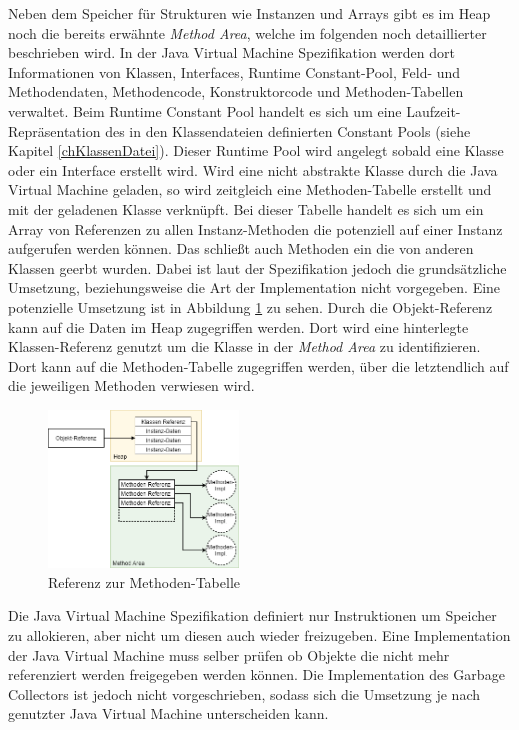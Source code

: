 \documentclass[conference]{IEEEtran}
\begin{document}
Neben dem Speicher für Strukturen wie Instanzen und Arrays gibt es im Heap noch die bereits erwähnte \textit{Method Area}, welche im folgenden noch detaillierter beschrieben wird. In der Java Virtual Machine Spezifikation werden dort Informationen von Klassen, Interfaces, Runtime Constant-Pool, Feld- und Methodendaten, Methodencode, Konstruktorcode und Methoden-Tabellen verwaltet. Beim Runtime Constant Pool handelt es sich um eine Laufzeit-Repräsentation des in den Klassendateien definierten Constant Pools (siehe Kapitel \ref{chKlassenDatei}). Dieser Runtime Pool wird angelegt sobald eine Klasse oder ein Interface erstellt wird. Wird eine nicht abstrakte Klasse durch die Java Virtual Machine geladen, so wird zeitgleich eine Methoden-Tabelle erstellt und mit der geladenen Klasse verknüpft. Bei dieser Tabelle handelt es sich um ein Array von Referenzen zu allen Instanz-Methoden die potenziell auf einer Instanz aufgerufen werden können. Das schließt auch Methoden ein die von anderen Klassen geerbt wurden. Dabei ist laut der Spezifikation jedoch die grundsätzliche Umsetzung, beziehungsweise die Art der Implementation nicht vorgegeben. Eine potenzielle Umsetzung ist in Abbildung \ref{fig:linkZurMethodenTabelle} zu sehen. Durch die Objekt-Referenz kann auf die Daten im Heap zugegriffen werden. Dort wird eine hinterlegte Klassen-Referenz genutzt um die Klasse in der \textit{Method Area} zu identifizieren. Dort kann auf die Methoden-Tabelle zugegriffen werden, über die letztendlich auf die jeweiligen Methoden verwiesen wird.
\begin{figure}[htbp] 
  \centering
     \includegraphics[width=0.45\textwidth]{Grafiken/LinkZurMethodenTabelle.png}
  \caption{Referenz zur Methoden-Tabelle}
  \label{fig:linkZurMethodenTabelle}
\end{figure}

Die Java Virtual Machine Spezifikation definiert nur Instruktionen um Speicher zu allokieren, aber nicht um diesen auch wieder freizugeben. Eine Implementation der Java Virtual Machine muss selber prüfen ob Objekte die nicht mehr referenziert werden freigegeben werden können. Die Implementation des Garbage Collectors ist jedoch nicht vorgeschrieben, sodass sich die Umsetzung je nach genutzter Java Virtual Machine unterscheiden kann. \cite{Venners.1999} 
\end{document}
